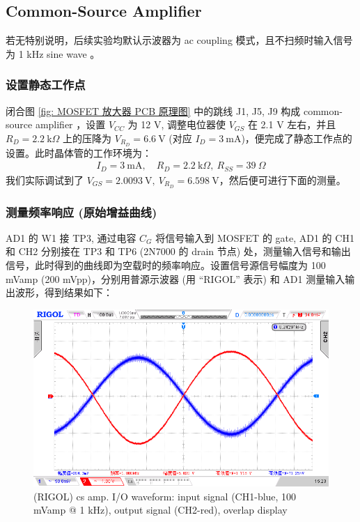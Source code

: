 \documentclass[UTF8]{article}
\begin{document}
\newpage
\subsection{Common-Source Amplifier}
\vspace*{-3mm}
\begin{redbox}
    若无特别说明，后续实验均默认示波器为 ac coupling 模式，且不扫频时输入信号为 1 kHz sine wave 。
\end{redbox}

\subsubsection{设置静态工作点}

闭合图 \ref{fig: MOSFET 放大器 PCB 原理图} 中的跳线 J1, J5, J9 构成 common-source amplifier ，设置 $V_{CC}$ 为 12 V, 调整电位器使 $V_{GS}$ 在 2.1 V 左右，并且 $R_D = 2.2\ \mathrm{k}\Omega$ 上的压降为 $V_{R_D} = 6.6 \ \mathrm{V}$ (对应 $I_D = 3 \ \mathrm{mA}$)，便完成了静态工作点的设置。此时晶体管的工作环境为：
\begin{gather}
I_D = 3 \ \mathrm{mA},\quad R_D = 2.2 \ \mathrm{k}\Omega, \ R_{SS} = 39 \ \Omega
\end{gather}
我们实际调试到了 $V_{GS} = 2.0093 \ \mathrm{V},\  V_{R_D} = 6.598 \ \mathrm{V}$，然后便可进行下面的测量。

\subsubsection{测量频率响应 (原始增益曲线)}

AD1 的 W1 接 TP3, 通过电容 $C_G$ 将信号输入到 MOSFET 的 gate, AD1 的 CH1 和 CH2 分别接在 TP3 和 TP6 (2N7000 的 drain 节点) 处，测量输入信号和输出信号，此时得到的曲线即为空载时的频率响应。设置信号源信号幅度为 100 mVamp (200 mVpp)，分别用普源示波器 (用 ``RIGOL'' 表示) 和 AD1 测量输入输出波形，得到结果如下：

\begin{figure}[H]\centering
    \includegraphics[width=\columnwidth]{LCE-04-场效应管/assets/cs amp/CS 输入输出波形 RIGOL.png}
    \caption{(RIGOL) cs amp. I/O waveform: input signal (CH1-blue, 100 mVamp @ 1 kHz), output signal (CH2-red), overlap display}
\end{figure}
\end{document}
